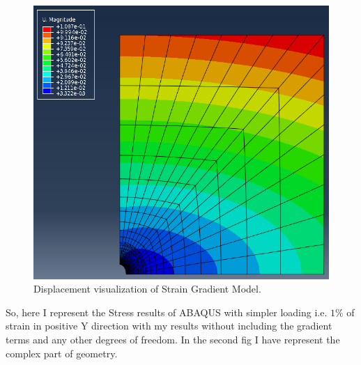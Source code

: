 \documentclass[12pt]{article}
\begin{document}
\begin{figure}[H]
	\begin{center}
		\includegraphics[scale=0.4]{MY_code_result_1.png} 
	\end{center}  
    \caption{Displacement visualization of Strain Gradient Model.}
\end{figure}
So, here I represent the Stress results of ABAQUS with simpler loading i.e. $ 1 \% $ of strain in positive Y direction with my results without including the gradient terms and any other degrees of freedom. In the second fig I have represent the complex part of geometry.
\end{document}
